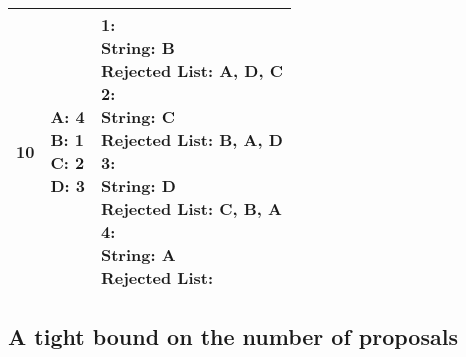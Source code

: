 \documentclass{article}
\begin{document}
\begin{center}
\begin{longtable}{ c|l|l }
        10 & \makecell{\textbf{A}: 4 \\ \textbf{B}: 1 \\ \textbf{C}: 2 \\ \textbf{D}: 3} &  
        \makecell{\textbf{1}:\\ \hspace{10mm} \textbf{String}: B \\ \hspace{10mm} \textbf{Rejected List}: A, D, C \\
                    \textbf{2}:\\ \hspace{10mm} \textbf{String}: C \\ \hspace{10mm} \textbf{Rejected List}: B, A, D \\
                    \textbf{3}:\\ \hspace{10mm} \textbf{String}: D \\ \hspace{10mm} \textbf{Rejected List}: C, B, A\\
                    \textbf{4}:\\ \hspace{10mm} \textbf{String}: A \\ \hspace{10mm} \textbf{Rejected List}: \\} \\
        \hline 

    \end{longtable}
\end{center}

\subsection{A tight bound on the number of proposals}
\end{document}
